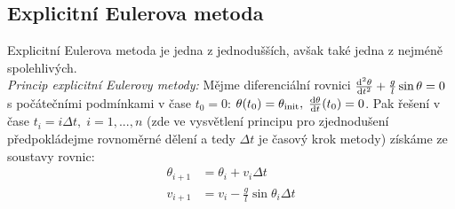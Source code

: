 \documentclass[reqno, a4paper]{amsart}
\begin{document}
\subsection{Explicitní Eulerova metoda}
Explicitní Eulerova metoda je jedna z jednodušších, avšak také jedna z nejméně spolehlivých.
\\
\textit{Princip explicitní Eulerovy metody:} Mějme diferenciální rovnici $\frac{\mathrm{d}^2 {\theta}}{\mathrm{d} {t}^2} + \frac{g}{l} \sin \theta = 0$ s počátečními podmínkami v čase $t_{0}=0$: $\theta(t_{0})=\theta_{\mathrm{init}},\; \frac{\mathrm{d} {\theta}}{\mathrm{d} {t}}(t_{0})=0$. Pak řešení v čase $t_{i}=i\Delta t,\; i=1,...,n$ (zde ve vysvětlení principu pro zjednodušení předpokládejme rovnoměrné dělení a tedy $ \Delta t$ je časový krok metody) získáme ze soustavy rovnic: 
\begin{align}
	\theta_{i+1}& =\theta_{i}+v_{i}\Delta t\\
	v_{i+1}& =v_{i}-\frac{g}{l}\sin\theta_{i}\Delta t
\end{align}
\end{document}
